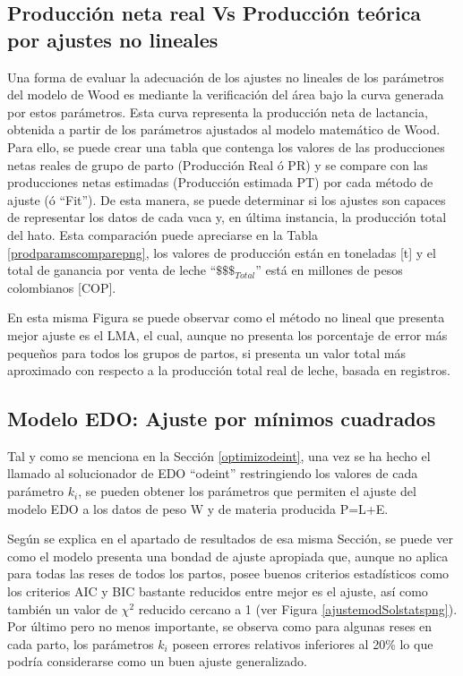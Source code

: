 \subsection{Producción neta real Vs Producción teórica por ajustes no lineales}

Una forma de evaluar la adecuación de los ajustes no lineales de los parámetros del modelo de Wood es mediante la verificación del área bajo la curva generada por estos parámetros. Esta curva representa la producción neta de lactancia, obtenida a partir de los parámetros ajustados al modelo matemático de Wood. Para ello, se puede crear una tabla que contenga los valores de las producciones netas reales de grupo de parto (Producción Real ó PR) y se compare con las producciones netas estimadas (Producción estimada PT) por cada método de ajuste (ó ``Fit''). De esta manera, se puede determinar si los ajustes son capaces de representar los datos de cada vaca y, en última instancia, la producción total del hato. Esta comparación puede apreciarse en la Tabla \ref{prodparamscomparepng}, los valores de producción están en toneladas [t] y el total de ganancia por venta de leche ``$\$\$\$_{Total}$'' está en millones de pesos colombianos [COP].

En esta misma Figura se puede observar como el método no lineal que presenta mejor ajuste es el LMA, el cual, aunque no presenta los porcentaje de error más pequeños para todos los grupos de partos, si presenta un valor total más aproximado con respecto a la producción total  real de leche, basada en registros.

\subsection{Modelo EDO: Ajuste por mínimos cuadrados}

Tal y como se menciona en la Sección \ref{optimizodeint}, una vez se ha hecho el llamado al solucionador de EDO ``odeint'' restringiendo los valores de cada parámetro $k_{i}$, se pueden obtener los parámetros que permiten el ajuste del modelo EDO a los datos de peso W y de materia producida P=L+E.

Según se explica en el apartado de resultados de esa misma Sección, se puede ver como el modelo presenta una bondad de ajuste apropiada que, aunque no aplica para todas las reses de todos los partos, posee buenos criterios estadísticos como los criterios AIC y BIC bastante reducidos entre mejor es el ajuste, así como también un valor de $\chi^{2}$ reducido cercano a 1 (ver Figura \ref{ajustemodSolstatspng}). Por último pero no menos importante, se observa como para algunas reses en cada parto, los parámetros $k_{i}$ poseen errores relativos inferiores al 20\% lo que podría considerarse como un buen ajuste generalizado.

